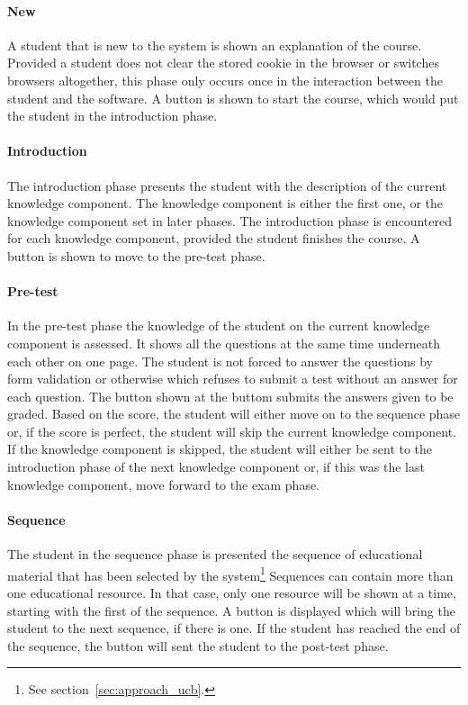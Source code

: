 \paragraph{New} A student that is new to the system is shown an explanation of
the course. Provided a student does not clear the stored cookie in the browser
or switches browsers altogether, this phase only occurs once in the interaction
between the student and the software. A button is shown to start the course,
which would put the student in the introduction phase.
\paragraph{Introduction} The introduction phase presents the student with the
description of the current knowledge component. The knowledge component is
either the first one, or the knowledge component set in later phases. The
introduction phase is encountered for each knowledge component, provided the
student finishes the course. A button is shown to move to the pre-test phase.
\paragraph{Pre-test} In the pre-test phase the knowledge of the student on the
current knowledge component is assessed. It shows all the questions at the same
time underneath each other on one page. The student is not forced to answer the
questions by form validation or otherwise which refuses to submit a test
without an answer for each question. The button shown at the buttom submits the
answers given to be graded. Based on the score, the student will either move on
to the sequence phase or, if the score is perfect, the student will skip the
current knowledge component. If the knowledge component is skipped, the student
will either be sent to the introduction phase of the next knowledge component
or, if this was the last knowledge component, move forward to the exam phase.
\paragraph{Sequence} The student in the sequence phase is presented the
sequence of educational material that has been selected by the
system\footnote{See section~\ref{sec:approach_ucb}.} Sequences can contain more
than one educational resource. In that case, only one resource will be shown at
a time, starting with the first of the sequence. A button is displayed which
will bring the student to the next sequence, if there is one. If the student
has reached the end of the sequence, the button will sent the student to the
post-test phase.
